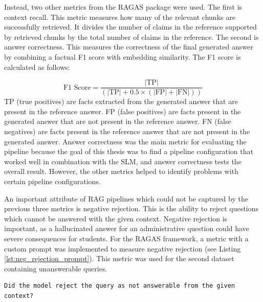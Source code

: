 \documentclass[12pt]{article} %
\begin{document}
Instead, two other metrics from the RAGAS package were used. The first is context recall. This metric measures how many of the relevant chunks are successfully retrieved. It divides the number of claims in the reference supported by retrieved chunks by the total number of claims in the reference. The second is answer correctness. This measures the correctness of the final generated answer by combining a factual F1 score with embedding similarity. The F1 score is calculated as follows:

$$\text{F1 Score} = \frac{|\text{TP}|}{(|\text{TP}| + 0.5 \times (|\text{FP}| + |\text{FN}|))}$$
TP (true positives) are facts extracted from the generated answer that are present in the reference answer. FP (false positives) are facts present in the generated answer that are not present in the reference answer. FN (false negatives) are facts present in the reference answer that are not present in the generated answer.
Answer correctness was the main metric for evaluating the pipeline because the goal of this thesis was to find a pipeline configuration that worked well in combination with the SLM, and answer correctness tests the overall result. However, the other metrics helped to identify problems with certain pipeline configurations.

An important attribute of RAG pipelines which could not be captured by the previous three metrics is negative rejection. This is the ability to reject questions which cannot be answered with the given context. Negative rejection is important, as a hallucinated answer for an administrative question could have severe consequences for students. For the RAGAS framework, a metric with a custom prompt was implemented to measure negative rejection (see Listing \ref{lst:neg_rejection_prompt}). This metric was used for the second dataset containing unanswerable queries.

\begin{lstlisting}[breaklines=true, basicstyle=\ttfamily, caption={Negative Rejection Prompt}, label={lst:neg_rejection_prompt}]
    Did the model reject the query as not answerable from the given context?
\end{lstlisting}
\end{document}
